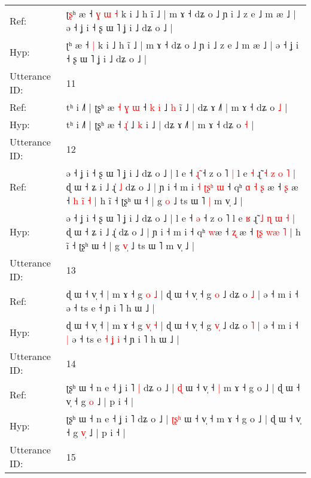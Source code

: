 \documentclass[10pt]{article}
\DeclareRobustCommand{\hl}[1]{{\textcolor{red}{#1}}}
\begin{document}
\begin{longtable}{ll}
Ref: & ʈ\hl{ʂ}ʰ æ ˧\hl{ }\hl{ɣ}\hl{ }\hl{ɯ} \hl{˧} k i ˩ h ĩ ˩ | m ɤ ˧ dʑ o ˩ ɲ i ˩ z e ˩ m æ ˩ | ə ˧ ʝ i ˧ ʂ ɯ ˥ ʝ i ˩ dʑ o ˩ |
 \\
Hyp: & ʈ\hl{}ʰ æ ˧\hl{}\hl{}\hl{}\hl{} \hl{|} k i ˩ h ĩ ˩ | m ɤ ˧ dʑ o ˩ ɲ i ˩ z e ˩ m æ ˩ | ə ˧ ʝ i ˧ ʂ ɯ ˥ ʝ i ˩ dʑ o ˩ |
 \\
\midrule
Utterance ID: & 11 \\
Ref: & tʰ i ˩˥ | ʈʂʰ æ\hl{ }\hl{˧}\hl{ }\hl{ɣ}\hl{ }\hl{ɯ} ˧ \hl{k}\hl{ }\hl{i} ˩ \hl{h} i\hl{̃} ˩ | dʑ ɤ ˩˥ | m ɤ ˧ dʑ o \hl{˩} |
 \\
Hyp: & tʰ i ˩˥ | ʈʂʰ æ\hl{}\hl{}\hl{}\hl{}\hl{}\hl{} ˧ \hl{}\hl{ɻ}\hl{̍} ˩ \hl{k} i\hl{} ˩ | dʑ ɤ ˩˥ | m ɤ ˧ dʑ o \hl{˧} |
 \\
\midrule
Utterance ID: & 12 \\
Ref: & ə ˧ ʝ i ˧ ʂ ɯ ˥ ʝ i ˩ dʑ o ˩ | l e ˧ \hl{ɻ}\hl{̃} ˧ z o ˥\hl{ }\hl{|} l e \hl{˧} ɻ̃ \hl{˧} \hl{z} \hl{o} \hl{˥} | ɖ ɯ ˧ ʑ i ˩ ɻ̍\hl{ }\hl{˩} dʑ o ˩ | ɲ i ˧ m i\hl{ }\hl{˧}\hl{ }\hl{ʈ}\hl{ʂ}\hl{ʰ}\hl{ }\hl{ɯ} ˧ qʰ\hl{ }\hl{ɑ}\hl{ }\hl{˧} \hl{ʂ}\hl{ }æ ˧ \hl{ʂ} æ ˧ \hl{}\hl{h} \hl{i}\hl{̃} \hl{˧} | h ĩ ˧ ʈʂʰ ɯ ˧ | g \hl{}\hl{o} ˩ ts ɯ ˥\hl{ }\hl{|} m v̩ ˩ |
 \\
Hyp: & ə ˧ ʝ i ˧ ʂ ɯ ˥ ʝ i ˩ dʑ o ˩ | l e ˧ \hl{}\hl{ə} ˧ z o ˥\hl{}\hl{} l e \hl{ʁ} ɻ̃ \hl{˩} \hl{ɳ} \hl{ɯ} \hl{˧} | ɖ ɯ ˧ ʑ i ˩ ɻ̍\hl{}\hl{} dʑ o ˩ | ɲ i ˧ m i\hl{}\hl{}\hl{}\hl{}\hl{}\hl{}\hl{}\hl{} ˧ qʰ\hl{}\hl{}\hl{}\hl{} \hl{}\hl{w}æ ˧ \hl{ʐ} æ ˧ \hl{ʈ}\hl{ʂ} \hl{w}\hl{æ} \hl{˥} | h ĩ ˧ ʈʂʰ ɯ ˧ | g \hl{v}\hl{̩} ˩ ts ɯ ˥\hl{}\hl{} m v̩ ˩ |
 \\
\midrule
Utterance ID: & 13 \\
Ref: & ɖ ɯ ˧ v̩ ˧ | m ɤ ˧ g \hl{}\hl{o} \hl{˩} | ɖ ɯ ˧ v̩ ˧ g \hl{}\hl{o} ˩ dʑ o \hl{˩} | ə ˧ m i ˧\hl{}\hl{} ə ˧ ts e\hl{}\hl{}\hl{}\hl{}\hl{}\hl{} ˧ ɲ i ˥ h ɯ ˩ |
 \\
Hyp: & ɖ ɯ ˧ v̩ ˧ | m ɤ ˧ g \hl{v}\hl{̩} \hl{˧} | ɖ ɯ ˧ v̩ ˧ g \hl{v}\hl{̩} ˩ dʑ o \hl{˥} | ə ˧ m i ˧\hl{ }\hl{|} ə ˧ ts e\hl{ }\hl{˧}\hl{ }\hl{ʝ}\hl{ }\hl{i} ˧ ɲ i ˥ h ɯ ˩ |
 \\
\midrule
Utterance ID: & 14 \\
Ref: & ʈʂʰ ɯ ˧ n e ˧ ʝ i ˥\hl{ }\hl{|} dʑ o ˩ | \hl{}\hl{}\hl{ɖ} ɯ ˧ v̩ ˧\hl{ }\hl{|} m ɤ ˧ g o ˩ | ɖ ɯ ˧ v̩ ˧ g \hl{}\hl{o} ˩ | p i ˧ |
 \\
Hyp: & ʈʂʰ ɯ ˧ n e ˧ ʝ i ˥\hl{}\hl{} dʑ o ˩ | \hl{ʈ}\hl{ʂ}\hl{ʰ} ɯ ˧ v̩ ˧\hl{}\hl{} m ɤ ˧ g o ˩ | ɖ ɯ ˧ v̩ ˧ g \hl{v}\hl{̩} ˩ | p i ˧ |
 \\
\midrule
Utterance ID: & 15 \\

\end{longtable}
\end{document}
